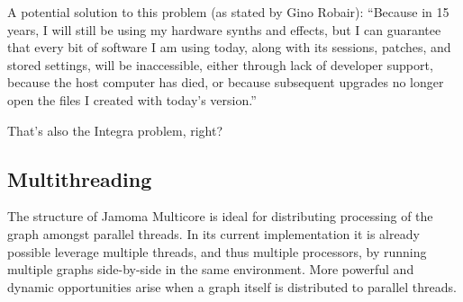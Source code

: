 \documentclass[twoside,a4paper]{article}
\begin{document}

A potential solution to this problem (as stated by Gino Robair):
``Because in 15 years, I will still be using my hardware synths and effects,
but I can guarantee that every bit of software I am using today, along with its sessions,
patches,
and stored settings,
will be inaccessible,
either through lack of developer support, because the host computer has died, 
or because subsequent upgrades no longer open the files I created with today's version.''

That's also the Integra problem, right?





\subsection{Multithreading} %

The structure of Jamoma Multicore is ideal for distributing processing of the graph amongst parallel threads.  In its current implementation it is already possible leverage multiple threads, and thus multiple processors, by running multiple graphs side-by-side in the same environment.  More powerful and dynamic opportunities arise when a graph itself is distributed to parallel threads.

%   




\end{document}
